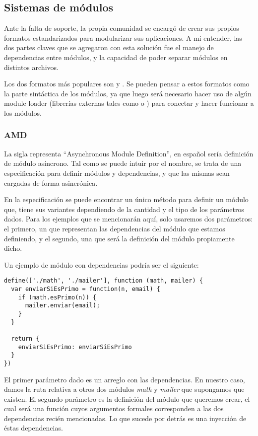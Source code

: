 \subsection{Sistemas de módulos}

Ante la falta de soporte, la propia comunidad se encargó de crear sus propios formatos estandarizados para modularizar sus aplicaciones. A mi entender, las dos partes claves que se agregaron con esta solución fue el manejo de dependencias entre módulos, y la capacidad de poder separar módulos en distintos archivos.

Los dos formatos más populares son  y . Se pueden pensar a estos formatos como la parte sintáctica de los módulos, ya que luego será necesario hacer uso de algún module loader (librerías externas tales como  o ) para conectar y hacer funcionar a los módulos.

\subsubsection{AMD}

La sigla representa "`Asynchronous Module Definition"', en español sería definición de módulo asíncrono. Tal como se puede intuir por el nombre, se trata de una especificación para definir módulos y dependencias, y que las mismas sean cargadas de forma asincrónica.

En la especificación se puede encontrar un único método  para definir un módulo que, tiene sus variantes dependiendo de la cantidad y el tipo de los parámetros dados. Para los ejemplos que se mencionarán aquí, solo usaremos dos parámetros: el primero, un  que representan las dependencias del módulo que estamos definiendo, y el segundo, una  que será la definición del módulo propiamente dicho.

Un ejemplo de módulo con dependencias podría ser el siguiente:

\begin{lstlisting}[title={Ejemplo de AMD}]
define(['./math', './mailer'], function (math, mailer) {
  var enviarSiEsPrimo = function(n, email) {
    if (math.esPrimo(n)) {
      mailer.enviar(email);
    }
  }

  return {
    enviarSiEsPrimo: enviarSiEsPrimo
  }
})
\end{lstlisting}

El primer parámetro dado es un arreglo con las dependencias. En nuestro caso, damos la ruta relativa a otros dos módulos \textit{math} y \textit{mailer} que supongamos que existen. El segundo parámetro es la definición del módulo que queremos crear, el cual será una función cuyos argumentos formales corresponden a las dos dependencias recién mencionadas. Lo que sucede por detrás es una inyección de éstas dependencias. 

